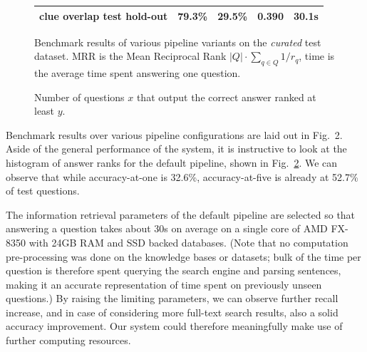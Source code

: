 \begin{figure}[t]
\begin{tabular}{|c|cccc|}
clue overlap test hold-out & 79.3\% & 29.5\% & 0.390 & 30.1s \\
\hline
\end{tabular}
\vspace*{-0.2cm}
\caption{Benchmark results of various pipeline variants on the \textit{curated} test dataset.
MRR is the Mean Reciprocal Rank $|Q|\cdot\sum_{q\in Q}{1/r_q}$, time is the average time spent answering one question.}
\label{fig:bench}
\end{figure}

\begin{figure}[t]
\begin{center}
\vspace*{-0.75cm}
\caption{Number of questions $x$ that output the correct answer ranked at least $y$.}
\label{fig:ranks}
\end{center}
\end{figure}%

Benchmark results over various pipeline configurations are laid out in Fig.~2. %
Aside of the general performance of the system,
it is instructive to look at the histogram of answer ranks
for the default pipeline, shown in Fig.~\ref{fig:ranks}.
We can observe that while accuracy-at-one is 32.6\%,
accuracy-at-five is already at 52.7\% of test questions.

The information retrieval parameters of the default pipeline are selected so
that answering a question takes about 30s on average on a single core of
AMD FX-8350 with 24GB RAM and SSD backed databases.
(Note that no computation pre-processing was done on the knowledge bases or datasets;
bulk of the time per question is therefore spent querying the search engine and parsing sentences,
making it an accurate representation of time spent on previously unseen questions.)
By raising the limiting
parameters, we can observe further recall increase, and in case of considering
more full-text search results, also a solid accuracy improvement.  Our system
could therefore meaningfully make use of further computing resources.


